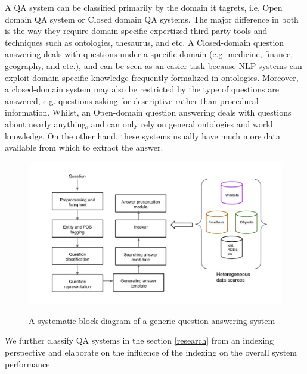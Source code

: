 \documentclass{article}
\begin{document}
A QA system can be classified primarily by the domain it tagrets, i.e. Open domain QA system or Closed domain QA systems. The major difference in both is the way they require domain specific expertized third party tools and techniques such as ontologies, thesaurus, and etc. A Closed-domain question answering deals with questions under a specific domain (e.g. medicine, finance, geography, and etc.), and can be seen as an easier task because NLP systems can exploit domain-specific knowledge frequently formalized in ontologies. Moreover, a closed-domain system may also be restricted by the type of questions are answered, e.g. questions asking for descriptive rather than procedural information. Whilst, an Open-domain question answering deals with questions about nearly anything, and can only rely on general ontologies and world knowledge. On the other hand, these systems usually have much more data available from which to extract the answer.


\begin{figure}[h]
\centering
\includegraphics[width=\textwidth]{block-diagram}
\label{blockdia}
\caption{A systematic block diagram of a generic question answering system}
\end{figure}

We further classify QA systems in the section \ref{research} from an indexing perspective and elaborate on the influence of the indexing on the overall system performance.
\end{document}
